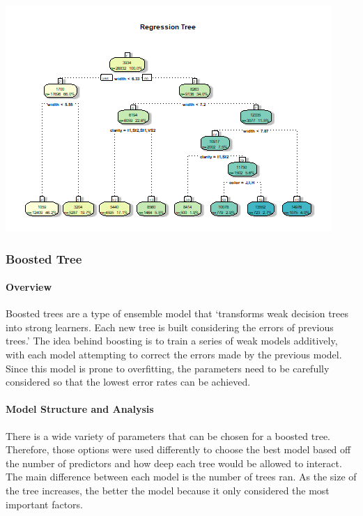 \documentclass[
  paper=a4,
  ,captions=tableheading
]{scrartcl}
\begin{document}
\begin{center}\includegraphics{Diamonds_PDF_files/figure-latex/Default Regression Tree-1} \end{center}

\hypertarget{boosted-tree}{%
\subsubsection{Boosted Tree}\label{boosted-tree}}

\hypertarget{overview-1}{%
\paragraph{Overview}\label{overview-1}}

Boosted trees are a type of ensemble model that `transforms weak
decision trees into strong learners. Each new tree is built considering
the errors of previous trees.' The idea behind boosting is to train a
series of weak models additively, with each model attempting to correct
the errors made by the previous model. Since this model is prone to
overfitting, the parameters need to be carefully considered so that the
lowest error rates can be achieved.

\hypertarget{model-structure-and-analysis-1}{%
\paragraph{Model Structure and
Analysis}\label{model-structure-and-analysis-1}}

There is a wide variety of parameters that can be chosen for a boosted
tree. Therefore, those options were used differently to choose the best
model based off the number of predictors and how deep each tree would be
allowed to interact. The main difference between each model is the
number of trees ran. As the size of the tree increases, the better the
model because it only considered the most important factors.
\end{document}
